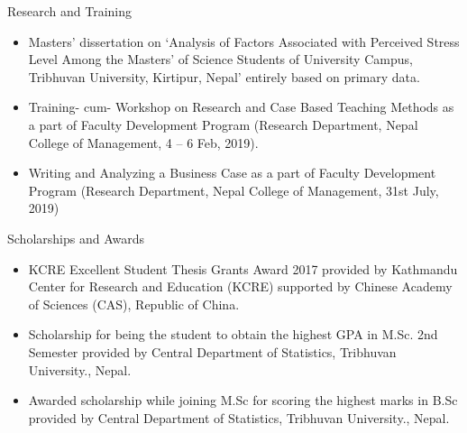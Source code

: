 \documentclass{resume} %
\begin{document}

\begin{rSection}{Research and Training} 
\begin{itemize}
    \item Masters' dissertation on ‘Analysis of Factors Associated with Perceived Stress Level Among the Masters’ of Science Students of University Campus, Tribhuvan University, Kirtipur, Nepal’ entirely based on primary data.
    \item Training- cum- Workshop on Research and Case Based Teaching Methods as a part  of Faculty Development Program (Research Department, Nepal College of Management, 4 – 6 Feb, 2019).
    \item Writing and Analyzing a Business Case as a part of Faculty Development Program (Research Department, Nepal College of Management, 31st July, 2019)
\end{itemize}
\end{rSection}

\begin{rSection}{Scholarships and Awards} 
\begin{itemize}
    \item KCRE Excellent Student Thesis Grants Award 2017 provided by Kathmandu Center for Research and Education (KCRE) supported by Chinese Academy of Sciences (CAS), Republic of China.
    \item Scholarship for being the student to obtain the highest GPA in M.Sc. 2nd Semester provided by Central Department of Statistics, Tribhuvan University., Nepal. 
    \item Awarded scholarship while joining M.Sc for scoring the highest marks in B.Sc provided by Central Department of Statistics, Tribhuvan University., Nepal.

\end{itemize}
\end{rSection}
\end{document}
